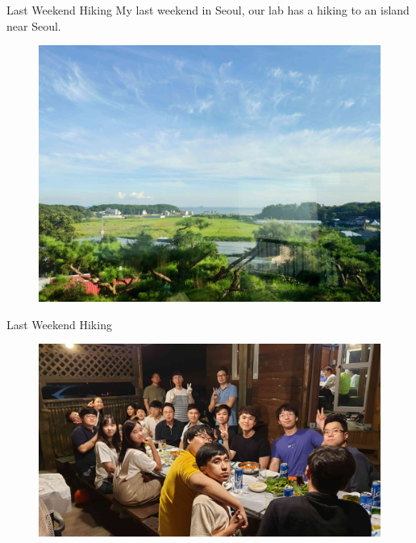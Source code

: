 \begin{frame}{Last Weekend Hiking}
My last weekend in Seoul, our lab has a hiking to an island near Seoul.
\begin{figure}
\centering
\includegraphics[width=0.9\linewidth]{figures/hiking_sight.jpg}
\end{figure}
\end{frame}

\begin{frame}{Last Weekend Hiking}

\begin{figure}
\centering
\includegraphics[width=0.9\linewidth]{figures/group_photo.jpg}
\end{figure}
\end{frame}




